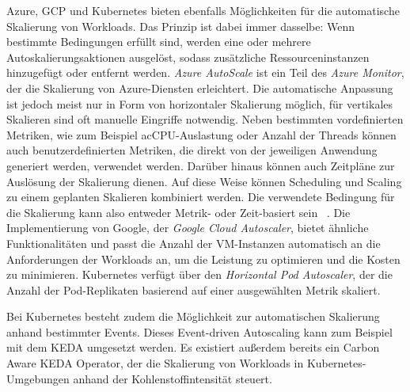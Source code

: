 Azure, \ac{GCP} und Kubernetes bieten ebenfalls Möglichkeiten für die automatische Skalierung von Workloads.
Das Prinzip ist dabei immer dasselbe:
Wenn bestimmte Bedingungen erfüllt sind, werden eine oder mehrere Autoskalierungsaktionen ausgelöst, sodass zusätzliche Ressourceninstanzen hinzugefügt oder entfernt werden.
\textit{Azure AutoScale} ist ein Teil des \textit{Azure Monitor}, der die Skalierung von Azure-Diensten erleichtert.
Die automatische Anpassung ist jedoch meist nur in Form von horizontaler Skalierung möglich, für vertikales Skalieren sind oft manuelle Eingriffe notwendig.
Neben bestimmten vordefinierten Metriken, wie zum Beispiel ac{CPU}-Auslastung oder Anzahl der Threads können auch benutzerdefinierten Metriken, die direkt von der jeweiligen Anwendung generiert werden, verwendet werden.
Darüber hinaus können auch Zeitpläne zur Auslösung der Skalierung dienen.
Auf diese Weise können Scheduling und Scaling zu einem geplanten Skalieren kombiniert werden.
Die verwendete Bedingung für die Skalierung kann also entweder Metrik- oder Zeit-basiert sein ~\cite{Microsoft.2023}.
Die Implementierung von Google, der \textit{Google Cloud Autoscaler}, bietet ähnliche Funktionalitäten und passt die Anzahl der \ac{VM}-Instanzen automatisch an die Anforderungen der Workloads an, um die Leistung zu optimieren und die Kosten zu minimieren.
Kubernetes verfügt über den \textit{Horizontal Pod Autoscaler}, der die Anzahl der Pod-Replikaten basierend auf einer ausgewählten Metrik skaliert.

Bei Kubernetes besteht zudem die Möglichkeit zur automatischen Skalierung anhand bestimmter Events.
Dieses Event-driven Autoscaling kann zum Beispiel mit dem \ac{KEDA} umgesetzt werden.
Es existiert außerdem bereits ein Carbon Aware \ac{KEDA} Operator, der die Skalierung von Workloads in Kubernetes-Umgebungen anhand der Kohlenstoffintensität steuert.

